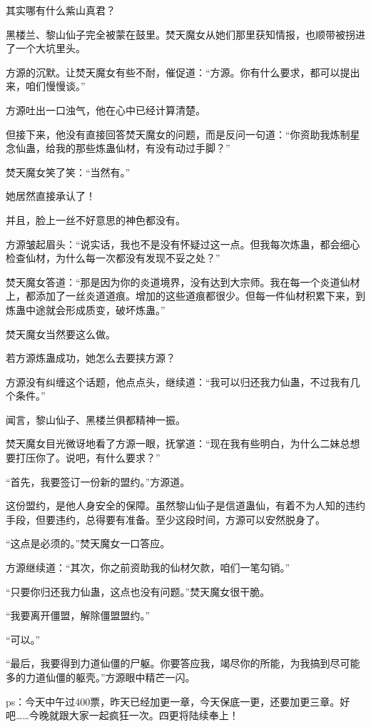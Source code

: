 \begin{this_body}
其实哪有什么紫山真君？

黑楼兰、黎山仙子完全被蒙在鼓里。焚天魔女从她们那里获知情报，也顺带被拐进了一个大坑里头。

方源的沉默。让焚天魔女有些不耐，催促道：“方源。你有什么要求，都可以提出来，咱们慢慢谈。”

方源吐出一口浊气，他在心中已经计算清楚。

但接下来，他没有直接回答焚天魔女的问题，而是反问一句道：“你资助我炼制星念仙蛊，给我的那些炼蛊仙材，有没有动过手脚？”

焚天魔女笑了笑：“当然有。”

她居然直接承认了！

并且，脸上一丝不好意思的神色都没有。

方源皱起眉头：“说实话，我也不是没有怀疑过这一点。但我每次炼蛊，都会细心检查仙材，为什么每一次都没有发现不妥之处？”

焚天魔女答道：“那是因为你的炎道境界，没有达到大宗师。我在每一个炎道仙材上，都添加了一丝炎道道痕。增加的这些道痕都很少。但每一件仙材积累下来，到炼蛊中途就会形成质变，破坏炼蛊。”

焚天魔女当然要这么做。

若方源炼蛊成功，她怎么去要挟方源？

方源没有纠缠这个话题，他点点头，继续道：“我可以归还我力仙蛊，不过我有几个条件。”

闻言，黎山仙子、黑楼兰俱都精神一振。

焚天魔女目光微讶地看了方源一眼，抚掌道：“现在我有些明白，为什么二妹总想要打压你了。说吧，有什么要求？”

“首先，我要签订一份新的盟约。”方源道。

这份盟约，是他人身安全的保障。虽然黎山仙子是信道蛊仙，有着不为人知的违约手段，但要违约，总得要有准备。至少这段时间，方源可以安然脱身了。

“这点是必须的。”焚天魔女一口答应。

方源继续道：“其次，你之前资助我的仙材欠款，咱们一笔勾销。”

“只要你归还我力仙蛊，这点也没有问题。”焚天魔女很干脆。

“我要离开僵盟，解除僵盟盟约。”

“可以。”

“最后，我要得到力道仙僵的尸躯。你要答应我，竭尽你的所能，为我搞到尽可能多的力道仙僵的躯壳。”方源眼中精芒一闪。

ps：今天中午过400票，昨天已经加更一章，今天保底一更，还要加更三章。好吧……今晚就跟大家一起疯狂一次。四更将陆续奉上！

\end{this_body}


